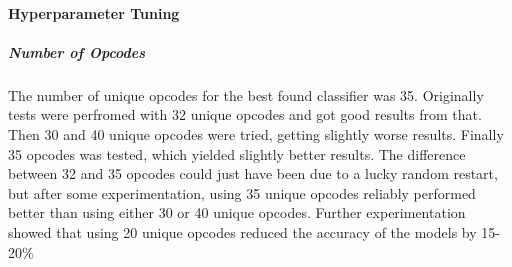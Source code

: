 \documentclass[12pt]{article}
\begin{document}
\paragraph{Hyperparameter Tuning}
  \subparagraph{Number of Opcodes}
  The number of unique opcodes for the best found classifier was 35. Originally tests were perfromed with 32 unique opcodes and got good results from that. Then 30 and 40 unique opcodes were tried, getting slightly worse results. Finally 35 opcodes was tested, which yielded slightly better results. The difference between 32 and 35 opcodes could just have been due to a lucky random restart, but after some experimentation, using 35 unique opcodes reliably performed better than using either 30 or 40 unique opcodes. Further experimentation showed that using 20 unique opcodes reduced the accuracy of the models by 15-20\%
  
\end{document}
